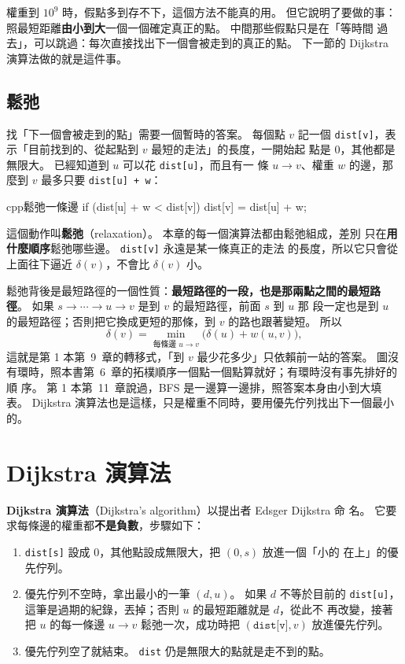 權重到 $10^9$ 時，假點多到存不下，這個方法不能真的用。 但它說明了要做的事：
照最短距離\textbf{由小到大}一個一個確定真正的點。 中間那些假點只是在「等時間
過去」，可以跳過：每次直接找出下一個會被走到的真正的點。 下一節的 Dijkstra
演算法做的就是這件事。

\subsection{鬆弛}

找「下一個會被走到的點」需要一個暫時的答案。 每個點 $v$ 記一個
\texttt{dist[v]}，表示「目前找到的、從起點到 $v$ 最短的走法」的長度，一開始起
點是 $0$，其他都是無限大。 已經知道到 $u$ 可以花 \texttt{dist[u]}，而且有一
條 $u \to v$、權重 $w$ 的邊，那麼到 $v$ 最多只要 \texttt{dist[u] + w}：

\begin{code}{cpp}{鬆弛一條邊}
if (dist[u] + w < dist[v]) {
    dist[v] = dist[u] + w;
}
\end{code}

這個動作叫\textbf{鬆弛}（relaxation）。 本章的每一個演算法都由鬆弛組成，差別
只在\textbf{用什麼順序}鬆弛哪些邊。 \texttt{dist[v]} 永遠是某一條真正的走法
的長度，所以它只會從上面往下逼近 $\delta(v)$，不會比 $\delta(v)$ 小。

鬆弛背後是最短路徑的一個性質：\textbf{最短路徑的一段，也是那兩點之間的最短路
徑}。 如果 $s \to \cdots \to u \to v$ 是到 $v$ 的最短路徑，前面 $s$ 到 $u$ 那
段一定也是到 $u$ 的最短路徑；否則把它換成更短的那條，到 $v$ 的路也跟著變短。
所以
\[
\delta(v) = \min_{\text{每條邊 } u \to v} \bigl(\delta(u) + w(u, v)\bigr),
\]
這就是第 1 本第~9~章的轉移式，「到 $v$ 最少花多少」只依賴前一站的答案。 圖沒
有環時，照本書第~6~章的拓樸順序一個點一個點算就好；有環時沒有事先排好的順
序。 第 1 本第~11~章說過，BFS 是一邊算一邊排，照答案本身由小到大填表。
Dijkstra 演算法也是這樣，只是權重不同時，要用優先佇列找出下一個最小的。

\section{Dijkstra 演算法}
\label{sec:sp-dijkstra}

\textbf{Dijkstra 演算法}（Dijkstra's algorithm）以提出者 Edsger Dijkstra 命
名。 它要求每條邊的權重都\textbf{不是負數}，步驟如下：

\begin{enumerate}
\item \texttt{dist[s]} 設成 $0$，其他點設成無限大，把 $(0, s)$ 放進一個「小的
在上」的優先佇列。
\item 優先佇列不空時，拿出最小的一筆 $(d, u)$。 如果 $d$ 不等於目前的
\texttt{dist[u]}，這筆是過期的紀錄，丟掉；否則 $u$ 的最短距離就是 $d$，從此不
再改變，接著把 $u$ 的每一條邊 $u \to v$ 鬆弛一次，成功時把
$(\texttt{dist[v]}, v)$ 放進優先佇列。
\item 優先佇列空了就結束。 \texttt{dist} 仍是無限大的點就是走不到的點。
\end{enumerate}


